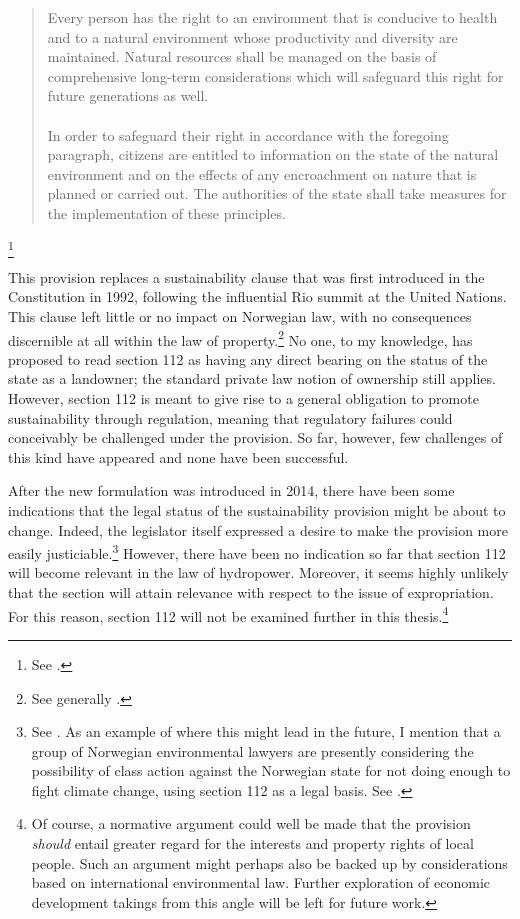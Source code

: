 \begin{quote}
Every person has the right to an environment that is conducive to
health and to a natural environment whose productivity and diversity
are maintained. Natural resources shall be managed on the basis of
comprehensive long-term considerations which will safeguard this
right for future generations as well. \\ \\

In order to safeguard their right in accordance with the foregoing
paragraph, citizens are entitled to information on the state of the
natural environment and on the effects of any encroachment on nature
that is planned or carried out. The authorities of the state shall take measures for the
implementation of these principles.
\end{quote}\footnote{See \cite[112]{grunnloven14}.}

This provision replaces a sustainability clause that was first introduced in the Constitution in 1992, following the influential Rio summit at the United Nations. This clause left little or no impact on Norwegian law, with no consequences discernible at all within the law of property.\footnote{See generally \cite{fauchald07}.} No one, to my knowledge, has proposed to read section 112 as having any direct bearing on the status of the state as a landowner; the standard private law notion of ownership still applies. However, section 112 is meant to give rise to a general obligation to promote sustainability through regulation, meaning that regulatory failures could conceivably be challenged under the provision. So far, however, few challenges of this kind have appeared and none have been successful. %

After the new formulation was introduced in 2014, there have been some indications that the legal status of the sustainability provision might be about to change. Indeed, the legislator itself expressed a desire to make the provision more easily justiciable.\footnote{See \cite[246]{dok16}. As an example of where this might lead in the future, I mention that a group of Norwegian environmental lawyers are presently considering the possibility of class action against the Norwegian state for not doing enough to fight climate change, using section 112 as a legal basis. See \cite{gjengedal15}.} However, there have been no indication so far that section 112 will become relevant in the law of hydropower. Moreover, it seems highly unlikely that the section will attain relevance with respect to the issue of expropriation. For this reason, section 112 will not be examined further in this thesis.\footnote{Of course, a normative argument could well be made that the provision {\it should} entail greater regard for the interests and property rights of local people. Such an argument might perhaps also be backed up by considerations based on international environmental law. Further exploration of economic development takings from this angle will be left for future work.}

